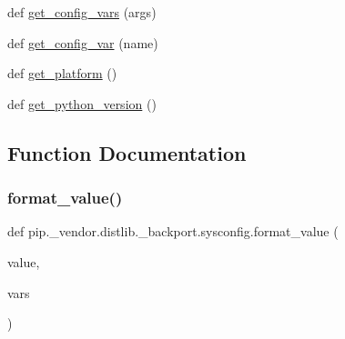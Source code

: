 \begin{DoxyCompactItemize}
\item 
def \hyperlink{namespacepip_1_1__vendor_1_1distlib_1_1__backport_1_1sysconfig_aeb4e1fa6967bb0c876d87f0045b149b8}{get\+\_\+config\+\_\+vars} (args)
\item 
def \hyperlink{namespacepip_1_1__vendor_1_1distlib_1_1__backport_1_1sysconfig_ad4f932848014ef28313f3645eb6472a9}{get\+\_\+config\+\_\+var} (name)
\item 
def \hyperlink{namespacepip_1_1__vendor_1_1distlib_1_1__backport_1_1sysconfig_a571427e3fde39508adc48fe58a2d6986}{get\+\_\+platform} ()
\item 
def \hyperlink{namespacepip_1_1__vendor_1_1distlib_1_1__backport_1_1sysconfig_ade2d7aba2fd68694224291a38fdbc828}{get\+\_\+python\+\_\+version} ()
\end{DoxyCompactItemize}


\subsection{Function Documentation}
\mbox{\label{namespacepip_1_1__vendor_1_1distlib_1_1__backport_1_1sysconfig_a4434c24e192c4dc21ca70389a309c98b}} 
\subsubsection{\texorpdfstring{format\+\_\+value()}{format\_value()}}
{\footnotesize\ttfamily def pip.\+\_\+vendor.\+distlib.\+\_\+backport.\+sysconfig.\+format\+\_\+value (\begin{DoxyParamCaption}\item[{}]{value,  }\item[{}]{vars }\end{DoxyParamCaption})}

\mbox{\label{namespacepip_1_1__vendor_1_1distlib_1_1__backport_1_1sysconfig_ac1c0653f6bf7d2c28680558fd6db37bd}} 
